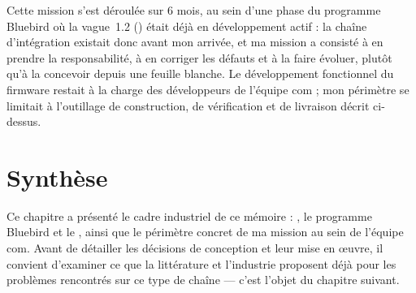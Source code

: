 Cette mission s'est déroulée sur 6 mois, au sein d'une
phase du programme Bluebird où la vague~1.2 (\ProduitCourt{}) était déjà en
développement actif : la chaîne d'intégration existait donc avant mon
arrivée, et ma mission a consisté à en prendre la responsabilité, à en
corriger les défauts et à la faire évoluer, plutôt qu'à la concevoir depuis
une feuille blanche. Le développement fonctionnel du firmware restait à la
charge des développeurs de l'équipe \gls{com} ; mon périmètre se limitait à
l'outillage de construction, de vérification et de livraison décrit
ci-dessus.

\section{Synthèse}
\label{sec:ctx-synthese}

Ce chapitre a présenté le cadre industriel de ce mémoire : \Entreprise{}, le
programme Bluebird et le \ProduitCourt{}, ainsi que le périmètre concret de
ma mission au sein de l'équipe \gls{com}. Avant de détailler les décisions de
conception et leur mise en œuvre, il convient d'examiner ce que la
littérature et l'industrie proposent déjà pour les problèmes rencontrés sur
ce type de chaîne — c'est l'objet du chapitre suivant.

